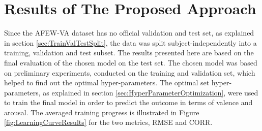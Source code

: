 \section{Results of The Proposed Approach} \label{sec:ResultsProposedApproach}
Since the AFEW-VA dataset has no official validation and test set, as explained in section \ref{sec:TrainValTestSplit}, the data was split subject-independently into a training, validation and test subset. The results presented here are based on the final evaluation of the chosen model on the test set. The chosen model was based on preliminary experiments, conducted on the training and validation set, which helped to find out the optimal hyper-parameters.
\newline\newline
The optimal set hyper-parameters, as explained in section \ref{sec:HyperParameterOptimization}, were used to train the final model in order to predict the outcome in terms of valence and arousal. The averaged training progress is illustrated in Figure \ref{fig:LearningCurveResults} for the two metrics, RMSE and CORR.

